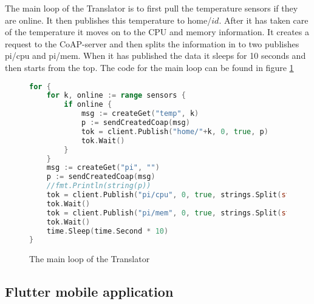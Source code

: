 The main loop of the Translator is to first pull the temperature sensors if they are online. It then publishes this temperature to home/$id$. After it has taken care of the temperature it moves on to the CPU and memory information. It creates a request to the CoAP-server and then splits the information in to two publishes pi/cpu and pi/mem. When it has published the data it sleeps for 10 seconds and then starts from the top. The code for the main loop can be found in figure \ref{code:translator:loop}

\begin{figure}[H]
    \begin{lstlisting}[language=go]
for {
    for k, online := range sensors {
        if online {
            msg := createGet("temp", k)
            p := sendCreatedCoap(msg)
            tok = client.Publish("home/"+k, 0, true, p)
            tok.Wait()
        }
    }
    msg := createGet("pi", "")
    p := sendCreatedCoap(msg)
    //fmt.Println(string(p))
    tok = client.Publish("pi/cpu", 0, true, strings.Split(string(p), ":")[0])
    tok.Wait()
    tok = client.Publish("pi/mem", 0, true, strings.Split(string(p), ":")[1])
    tok.Wait()
    time.Sleep(time.Second * 10)
}
\end{lstlisting}
    \caption{The main loop of the Translator}
    \label{code:translator:loop}
\end{figure}

\subsection{Flutter mobile application}
